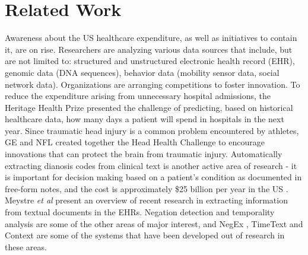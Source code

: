 \section{Related Work}
\label{sec:related}
Awareness about the US healthcare expenditure, as well as initiatives to contain it, are on rise. Researchers are analyzing various data sources that include, but are not limited to: structured and unstructured electronic health record (EHR), genomic data (DNA sequences), behavior data (mobility sensor data, social network data). Organizations are arranging competitions to foster innovation. To reduce the expenditure arising from unnecessary hospital admissions, the Heritage Health Prize \cite{hhp} presented the challenge of predicting, based on historical healthcare data, how many days a patient will spend in hospitals in the next year. Since traumatic head injury is a common problem encountered by athletes, GE and NFL created together the Head Health Challenge \cite{hhc} to encourage innovations that can protect the brain from traumatic injury. Automatically extracting dianosis codes from clinical text is another active area of research - it is important for decision making based on a patient's condition as documented in free-form notes, and the cost is approximately \$25 billion per year in the US \cite{siam-health}. Meystre {\em et al} \cite{MSKH08} present an overview of recent research in extracting information from textual documents in the EHRs. Negation detection and temporality analysis are some of the other areas of major interest, and NegEx \cite{Chapman01}, TimeText \cite{ZPH07} and Context \cite{CCD07} are some of the systems that have been developed out of research in these areas.

